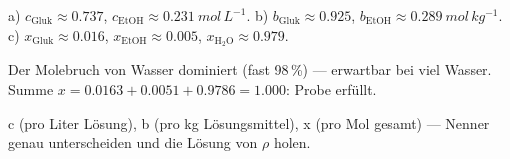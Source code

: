 \begin{ergebnis}
a) $c_{\text{Gluk}}\approx0.737$, $c_{\text{EtOH}}\approx0.231\ mol\,L^{-1}$.
b) $b_{\text{Gluk}}\approx0.925$, $b_{\text{EtOH}}\approx0.289\ mol\,kg^{-1}$.
c) $x_{\text{Gluk}}\approx0.016$, $x_{\text{EtOH}}\approx0.005$,
$x_{\text{H}_2\text{O}}\approx0.979$.
\end{ergebnis}

\begin{kontrolle}
Der Molebruch von Wasser dominiert (fast 98\,\%) --- erwartbar bei viel
Wasser. Summe $x=0.0163+0.0051+0.9786=1.000$: Probe erfüllt.
\end{kontrolle}

\begin{merksatz}
c (pro Liter Lösung), b (pro kg Lösungsmittel), x (pro Mol gesamt) ---
Nenner genau unterscheiden und die Lösung von $\rho$ holen.
\end{merksatz}
